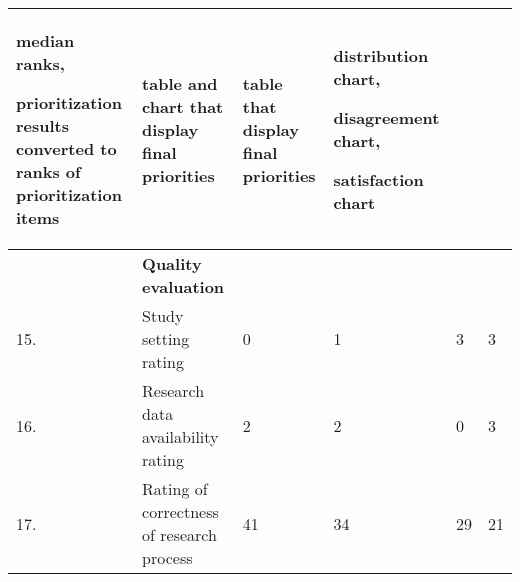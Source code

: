 \begin{table}[h!]
{\begin{tabular}{|>{\raggedright}p{}|>{\raggedright}p{}|>{\raggedright}p{}|>{\raggedright}p{}|>{\raggedright}p{}|>{\raggedright}p{}|}
median ranks,

prioritization results converted to ranks of prioritization items &
table and chart that display final priorities
&
table that display final priorities
&
distribution chart,

disagreement chart,

satisfaction chart\tabularnewline
\hline 
 & \textbf{Quality evaluation} &  &  &  & \tabularnewline
\hline 
15. & Study setting rating & 0 & 1 & 3 & 3\tabularnewline
\hline 
16. & Research data availability rating & 2 & 2 & 0 & 3\tabularnewline
\hline 
17. & Rating of correctness of research process & 41 & 34 & 29 & 21\tabularnewline
\hline
\end{tabular}%
}
\end{table}

